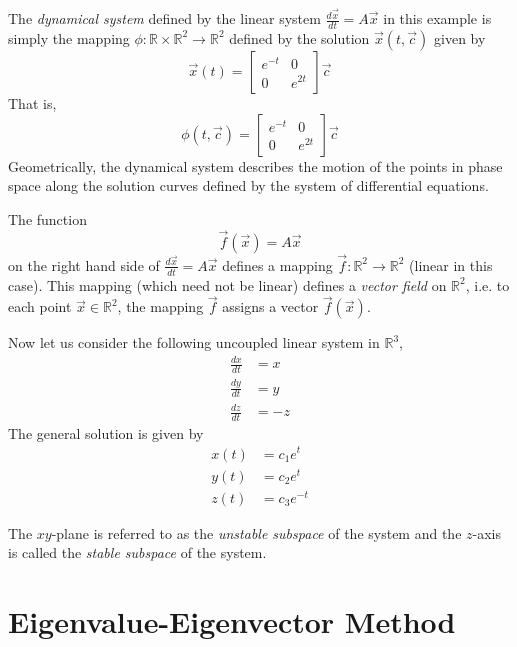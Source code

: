 \documentclass[11pt]{book}
\theoremstyle{definition}\newtheorem{definition}[subsection]{Definition}
\theoremstyle{definition}\newtheorem{example}[subsection]{Example}
\theoremstyle{definition}\newtheorem{notation}[subsection]{Notation}
\theoremstyle{definition}\newtheorem{remark}[subsection]{Remark}
\theoremstyle{theorem}\newtheorem{theorem}[subsection]{Theorem}
\theoremstyle{theorem}\newtheorem{lemma}[subsection]{Lemma}
\theoremstyle{theorem}\newtheorem{proposition}[subsection]{Proposition}
\theoremstyle{theorem}\newtheorem{corollary}[subsection]{Corollary}
\theoremstyle{theorem}\newtheorem{case}{Case}
\theoremstyle{remark}\newtheorem{subcase}{Subcase}[case]
\newcommand{\R}{\mathbb{R}}
\begin{document}
The \emph{dynamical system} defined by the linear system $\frac{d\vec{x}}{dt} = A\vec{x}$ in this example is simply the mapping $\phi : \R \times \R^2 \to \R^2$ defined by the solution $\vec{x}(t, \vec{c})$ given by 
\begin{equation*}
    \vec{x}(t) = \begin{bmatrix} e^{-t} & 0 \\ 0 & e^{2t} \end{bmatrix} \vec{c}
\end{equation*}
That is,
\begin{equation*}
    \phi(t, \vec{c}) = \begin{bmatrix} e^{-t} & 0 \\ 0 & e^{2t} \end{bmatrix} \vec{c}
\end{equation*}
Geometrically, the dynamical system describes the motion of the points in phase space along the solution curves defined by the system of differential equations.

The function
\begin{equation*}
    \vec{f}(\vec{x}) = A\vec{x}
\end{equation*}
on the right hand side of $\frac{d\vec{x}}{dt} = A\vec{x}$ defines a mapping $\vec{f} : \R^2 \to \R^2$ (linear in this case). This mapping (which need not be linear) defines a \emph{vector field} on $\R^2$, i.e. to each point $\vec{x} \in \R^2$, the mapping $\vec{f}$ assigns a vector $\vec{f}(\vec{x})$. 

Now let us consider the following uncoupled linear system in $\R^3$,
\begin{align*}
    \frac{dx}{dt} &= x \\
    \frac{dy}{dt} &= y \\
    \frac{dz}{dt} &= -z
\end{align*}
The general solution is given by
\begin{align*}
    x(t) &= c_1e^t \\
    y(t) &= c_2e^t \\
    z(t) &= c_3e^{-t}
\end{align*}

The $xy$-plane is referred to as the \emph{unstable subspace} of the system and the $z$-axis is called the \emph{stable subspace} of the system.  

\section{Eigenvalue-Eigenvector Method}
\end{document}
